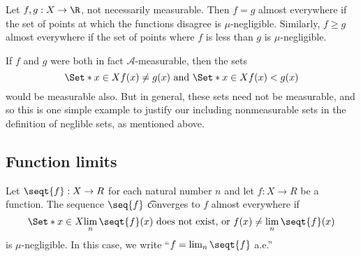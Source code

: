 Let $f, g: X \to \R $, not necessarily measurable.
Then $f = g$ almost everywhere if the set of points at which the functions disagree is
$\mu $-negligible.
Similarly, $f \geq g$ almost everywhere if the set of points where $f$ is less than $g$ is $\mu $-negligible.

If $f$ and $g$ were both in fact $\mathcal{A} $-measurable, then the sets
\[
\Set*{x \in X}{f(x) \neq g(x)}
\text{ and }
\Set*{x \in X}{f(x) < g(x)}
\]
would be measurable also.
But in general, these sets need not be measurable, and so this is one simple example to justify our including nonmeasurable sets in the definition of neglible sets, as mentioned above.

\subsection*{Function limits}

Let $\seqt{f}: X \to R$ for each natural number $n$ and let $f: X \to R$ be a function.
The sequence $\seq{f}$ \t{converges to $f$ almost everywhere} if
\[
\Set*{x \in X}{\lim_{n} \seqt{f}(x) \text{ does not exist, or } f(x) \neq \lim_{n} \seqt{f}(x)}
\]
is $\mu $-negligible.
In this case, we write ``$f = \lim_n \seqt{f}$ a.e.''

